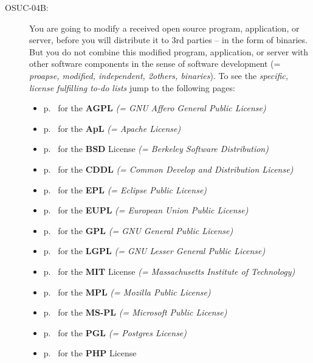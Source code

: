 \begin{description}
\item[OSUC-04B:]\label{OSUC-04B-DEF} You are going to modify a received open
source program, application, or server, before you will distribute it to 3rd
parties -- in the form of binaries. But you do not combine this modified
program, application, or server with other software components in the sense of
software development (= \textit{proapse, modified, independent, 2others,
binaries}). To see the \textit{specific, license fulfilling to-do lists} jump to
the following pages:
  \begin{itemize}
    \item p.\ \pageref{OSUC-04B-AGPL} for the \textbf{AGPL}
      \textit{(= GNU Affero General Public License)} 
    \item p.\ \pageref{OSUC-04B-Apache20} for the \textbf{ApL}
      \textit{(= Apache License)}
    \item p.\ \pageref{OSUC-04B-BSD} for the \textbf{BSD} License
      \textit{(= Berkeley Software Distribution)}
    \item p.\ \pageref{OSUC-04B-CDDL} for the \textbf{CDDL}
      \textit{(= Common Develop and Distribution License)}  
    \item p.\ \pageref{OSUC-04B-EPL} for the \textbf{EPL}
      \textit{(= Eclipse Public License)}     
    \item p.\ \pageref{OSUC-04B-EUPL} for the \textbf{EUPL}
      \textit{(= European Union Public License)} 
    \item p.\ \pageref{OSUC-04B-GPL} for the \textbf{GPL}
       \textit{(= GNU General Public License)} 
    \item p.\ \pageref{OSUC-04B-LGPL} for the \textbf{LGPL}
      \textit{(= GNU Lesser General Public License)}           
    \item p.\ \pageref{OSUC-04B-MIT} for the \textbf{MIT} License
       \textit{(= Massachusetts Institute of Technology)} 
    \item p.\ \pageref{OSUC-04B-MPL} for the \textbf{MPL}
      \textit{(= Mozilla Public License)}     
    \item p.\ \pageref{OSUC-04B-MS-PL} for the \textbf{MS-PL}
      \textit{(= Microsoft Public License)} 
    \item p.\ \pageref{OSUC-04B-PGL} for the \textbf{PGL}
      \textit{(= Postgres License)} 
    \item p.\ \pageref{OSUC-04B-PHP} for the \textbf{PHP} License 
  \end{itemize}



\end{description}
